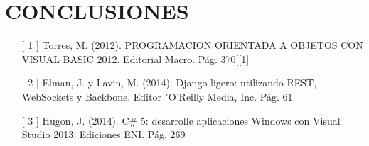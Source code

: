 \section{CONCLUSIONES}

\begin{itemize}
	\item [[ 1]]  Torres, M. (2012). PROGRAMACION ORIENTADA A OBJETOS CON VISUAL BASIC 2012. Editorial Macro. Pág. 370[[1]
 	\item   [[ 2]] Elman, J. y Lavin, M. (2014). Django ligero: utilizando REST, WebSockets y Backbone. Editor "O'Reilly Media, Inc. Pág. 61
	\item  [[ 3]]  Hugon, J. (2014). C\# 5: desarrolle aplicaciones Windows con Visual Studio 2013. Ediciones ENI. Pág. 269
\end{itemize}

